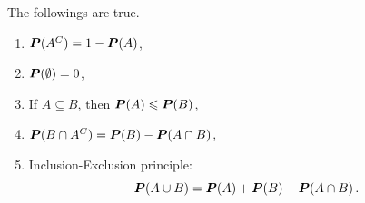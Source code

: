\begin{proposition}
   The followings are true.
   \begin{enumerate}
       \item $\P(A^C) = 1 - \P(A)$,
       \item $\P(\emptyset) = 0$,
       \item If $A\subseteq B$, then $\P(A) \leq \P(B)$,
       \item $\P(B \cap A^C) = \P(B) - \P(A\cap B)$,
       \item Inclusion-Exclusion principle:
           \begin{equation*}
            \P(A\cup B) = \P(A) + \P(B) - \P(A\cap B) \,.
           \end{equation*}
   \end{enumerate}
\end{proposition}

